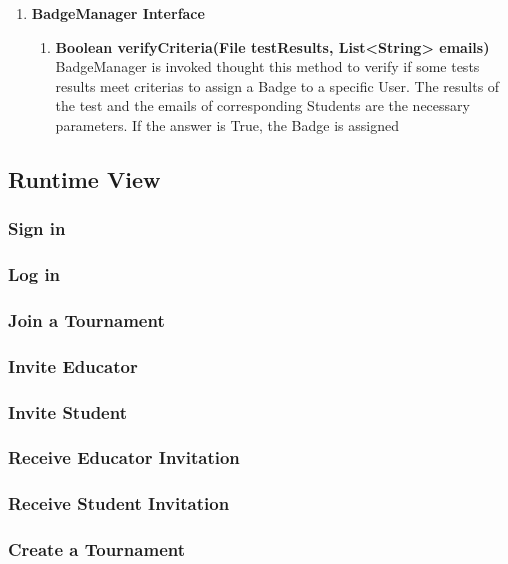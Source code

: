 \begin{enumerate}
\begin{enumerate}[label=$\bullet$]
        \end{enumerate}
    \item \textbf{BadgeManager Interface}
        \begin{enumerate}[label=$\bullet$]
            \item \textbf{Boolean verifyCriteria(File testResults, List<String> emails)} BadgeManager is invoked thought this method to verify if some tests results meet criterias to assign a Badge to a specific User. The results of the test and the emails of corresponding Students are the necessary parameters. If the answer is True, the Badge is assigned
        \end{enumerate}
\end{enumerate}
\subsection{Runtime View}
\subsubsection{Sign in}
\subsubsection{Log in}
\subsubsection{Join a Tournament}
\subsubsection{Invite Educator}
\subsubsection{Invite Student}
\subsubsection{Receive Educator Invitation}
\subsubsection{Receive Student Invitation}
\subsubsection{Create a Tournament}
